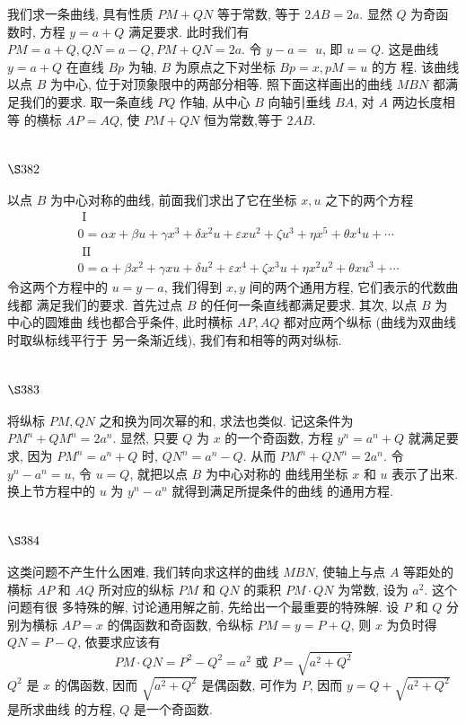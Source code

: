 我们求一条曲线, 具有性质 $P M+Q N$ 等于常数, 等于 $2 A B=2 a$. 显然 $Q$ 为奇函数时, 方程 $y=a+Q$ 满足要求. 此时我们有 $P M=a+Q, Q N=a-Q, P M+Q N=2 a$. 令 $y-a=$ $u$, 即 $u=Q$. 这是曲线 $y=a+Q$ 在直线 $B p$ 为轴, $B$ 为原点之下对坐标 $B p=x, p M=u$ 的方 程. 该曲线以点 $B$ 为中心, 位于对顶象限中的两部分相等. 照下面这样画出的曲线 $M B N$ 都满足我们的要求. 取一条直线 $P Q$ 作轴, 从中心 $B$ 向轴引垂线 $B A$, 对 $A$ 两边长度相等 的横标 $A P=A Q$, 使 $P M+Q N$ 恒为常数,等于 $2 A B$.

\section{$\S 382$}

以点 $B$ 为中心对称的曲线, 前面我们求出了它在坐标 $x, u$ 之下的两个方程
\[
\begin{aligned}
& \text { I } \\
& 0=\alpha x+\beta u+\gamma x^{3}+\delta x^{2} u+\varepsilon x u^{2}+\zeta u^{3}+\eta x^{5}+\theta x^{4} u+\cdots \\
& \text { II } \\
& 0=\alpha+\beta x^{2}+\gamma x u+\delta u^{2}+\varepsilon x^{4}+\zeta x^{3} u+\eta x^{2} u^{2}+\theta x u^{3}+\cdots
\end{aligned}
\]
令这两个方程中的 $u=y-a$, 我们得到 $x, y$ 间的两个通用方程, 它们表示的代数曲线都 满足我们的要求. 首先过点 $B$ 的任何一条直线都满足要求. 其次, 以点 $B$ 为中心的圆雉曲 线也都合乎条件, 此时横标 $A P, A Q$ 都对应两个纵标 (曲线为双曲线时取纵标线平行于 另一条渐近线), 我们有和相等的两对纵标. 

\section{$\S 383$}
将纵标 $P M, Q N$ 之和换为同次幂的和, 求法也类似. 记这条件为 $P M^{n}+Q M^{n}=2 a^{n}$. 显然, 只要 $Q$ 为 $x$ 的一个奇函数, 方程 $y^{n}=a^{n}+Q$ 就满足要求, 因为 $P M^{n}=a^{n}+Q$ 时, $Q N^{n}=a^{n}-Q$. 从而 $P M^{n}+Q N^{n}=2 a^{n}$. 令 $y^{n}-a^{n}=u$, 令 $u=Q$, 就把以点 $B$ 为中心对称的 曲线用坐标 $x$ 和 $u$ 表示了出来. 换上节方程中的 $u$ 为 $y^{n}-a^{n}$ 就得到满足所提条件的曲线 的通用方程.

\section{$\S 384$}

这类问题不产生什么困难, 我们转向求这样的曲线 $M B N$, 使轴上与点 $A$ 等距处的 横标 $A P$ 和 $A Q$ 所对应的纵标 $P M$ 和 $Q N$ 的乘积 $P M \cdot Q N$ 为常数, 设为 $a^{2}$. 这个问题有很 多特殊的解, 讨论通用解之前, 先给出一个最重要的特殊解. 设 $P$ 和 $Q$ 分别为横标 $A P=x$ 的偶函数和奇函数, 令纵标 $P M=y=P+Q$, 则 $x$ 为负时得 $Q N=P-Q$, 依要求应该有
\[
P M \cdot Q N=P^{2}-Q^{2}=a^{2} \text { 或 } P=\sqrt{a^{2}+Q^{2}}
\]
$Q^{2}$ 是 $x$ 的偶函数, 因而 $\sqrt{a^{2}+Q^{2}}$ 是偶函数, 可作为 $P$, 因而 $y=Q+\sqrt{a^{2}+Q^{2}}$ 是所求曲线 的方程, $Q$ 是一个奇函数.

